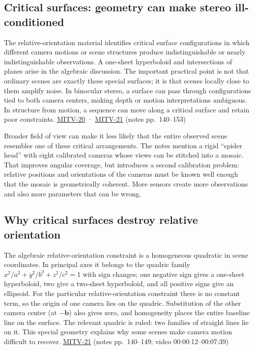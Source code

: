 \subsection{Critical surfaces: geometry can make stereo ill-conditioned}\label{04-visual-computing-ii-ch032-critical-surfaces-geometry-can-make-stereo-ill-conditioned}

The relative-orientation material identifies critical surface configurations in which different camera motions or scene structures produce indistinguishable or nearly indistinguishable observations. A one-sheet hyperboloid and intersections of planes arise in the algebraic discussion. The important practical point is not that ordinary scenes are exactly these special surfaces; it is that scenes locally close to them amplify noise. In binocular stereo, a surface can pass through configurations tied to both camera centers, making depth or motion interpretations ambiguous. In structure from motion, a sequence can move along a critical surface and retain poor constraints. \hyperref[04-visual-computing-ii-ch036-mitv-20---space-of-rotations-regular-tessellations-critical-surfaces-binocular-stereo]{MITV-20} · \hyperref[04-visual-computing-ii-ch036-mitv-21---relative-orientation-binocular-stereo-structure-quadrics-calibration-reprojection]{MITV-21} (notes pp.~140--153)

Broader field of view can make it less likely that the entire observed scene resembles one of these critical arrangements. The notes mention a rigid ``spider head'' with eight calibrated cameras whose views can be stitched into a mosaic. That improves angular coverage, but introduces a second calibration problem: relative positions and orientations of the cameras must be known well enough that the mosaic is geometrically coherent. More sensors create more observations and also more parameters that can be wrong.

\subsection{Why critical surfaces destroy relative orientation}\label{04-visual-computing-ii-ch032-why-critical-surfaces-destroy-relative-orientation}

The algebraic relative-orientation constraint is a homogeneous quadratic in scene coordinates. In principal axes it belongs to the quadric family \(x^2/a^2+y^2/b^2+z^2/c^2=1\) with sign changes; one negative sign gives a one-sheet hyperboloid, two give a two-sheet hyperboloid, and all positive signs give an ellipsoid. For the particular relative-orientation constraint there is no constant term, so the origin of one camera lies on the quadric. Substitution of the other camera center (at \(-\mathbf{b}\)) also gives zero, and homogeneity places the entire baseline line on the surface. The relevant quadric is ruled: two families of straight lines lie on it. This special geometry explains why some scenes make camera motion difficult to recover. \hyperref[04-visual-computing-ii-ch036-mitv-21---relative-orientation-binocular-stereo-structure-quadrics-calibration-reprojection]{MITV-21} (notes pp.~140--149; video 00:00:12--00:07:39)


